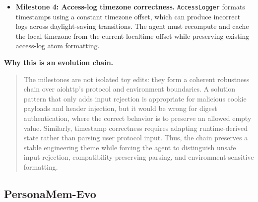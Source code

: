 \documentclass{article}
\begin{document}
\begin{tcolorbox}
\begin{itemize}[leftmargin=1.5em]
      \item \textbf{Milestone 4: Access-log timezone correctness.}
      \texttt{AccessLogger} formats timestamps using a constant timezone offset, which can produce incorrect logs across
daylight-saving transitions. The agent must recompute and cache the local timezone from the current localtime offset while
preserving existing access-log atom formatting.
  \end{itemize}

  \vspace{0.5em}
  \textbf{Why this is an evolution chain.}
  \begin{quote}
  The milestones are not isolated toy edits: they form a coherent robustness chain over aiohttp's protocol and environment
boundaries. A solution pattern that only adds input rejection is appropriate for malicious cookie payloads and header injection,
but it would be wrong for digest authentication, where the correct behavior is to preserve an allowed empty value. Similarly,
timestamp correctness requires adapting runtime-derived state rather than parsing user protocol input. Thus, the chain preserves
a stable engineering theme while forcing the agent to distinguish unsafe input rejection, compatibility-preserving parsing, and
environment-sensitive formatting.
  \end{quote}

  \end{tcolorbox}

\subsection{PersonaMem-Evo}
\end{document}
